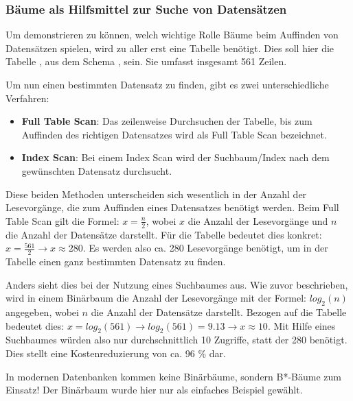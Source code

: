         \subsubsection{B\"aume als Hilfsmittel zur Suche von Datens\"atzen}
          Um demonstrieren zu k\"onnen, welch wichtige Rolle B\"aume beim
          Auffinden von Datens\"atzen spielen, wird zu aller erst eine Tabelle
          ben\"otigt. Dies soll hier die Tabelle , aus dem
          Schema , sein. Sie umfasst insgesamt 561 Zeilen.

          Um nun einen bestimmten Datensatz zu finden, gibt es zwei
          unterschiedliche Verfahren:
          \begin{itemize}
            \item \textbf{Full Table Scan}: Das zeilenweise Durchsuchen der
            Tabelle, bis zum Auffinden des richtigen Datensatzes wird als Full
            Table Scan bezeichnet.
            \item \textbf{Index Scan}: Bei einem Index Scan wird der
            Suchbaum/Index nach dem gew\"unschten Datensatz durchsucht.
          \end{itemize}
          Diese beiden Methoden unterscheiden sich wesentlich in der Anzahl der
          Lesevorg\"ange, die zum Auffinden eines Datensatzes ben\"otigt werden.
          Beim Full Table Scan gilt die Formel: $x = \frac{n}{2}$, wobei $x$ die
          Anzahl der Lesevorg\"ange und $n$ die Anzahl der Datens\"atze darstellt.
          F\"ur die Tabelle  bedeutet dies konkret: $x =
          \frac{561}{2} \rightarrow x \approx 280$. Es werden also ca. 280
          Lesevorg\"ange ben\"otigt, um in der Tabelle  einen
          ganz bestimmten Datensatz zu finden.

          Anders sieht dies bei der Nutzung eines Suchbaumes aus. Wie zuvor
          beschrieben, wird in einem Bin\"arbaum die Anzahl der Lesevorg\"ange
          mit der Formel: $log_2(n)$ angegeben, wobei $n$ die Anzahl der
          Datens\"atze darstellt. Bezogen auf die Tabelle 
          bedeutet dies: $x = log_2(561) \rightarrow log_2(561) = 9.13
          \rightarrow x \approx 10$. Mit Hilfe eines Suchbaumes w\"urden also
          nur durchschnittlich 10 Zugriffe, statt der 280 ben\"otigt. Dies
          stellt eine Kostenreduzierung von ca. 96 \% dar.
          \begin{merke}
            In modernen Datenbanken kommen keine Bin\"arb\"aume, sondern
            B*-B\"aume zum Einsatz! Der Bin\"arbaum wurde hier nur als einfaches
            Beispiel gew\"ahlt.
          \end{merke}
